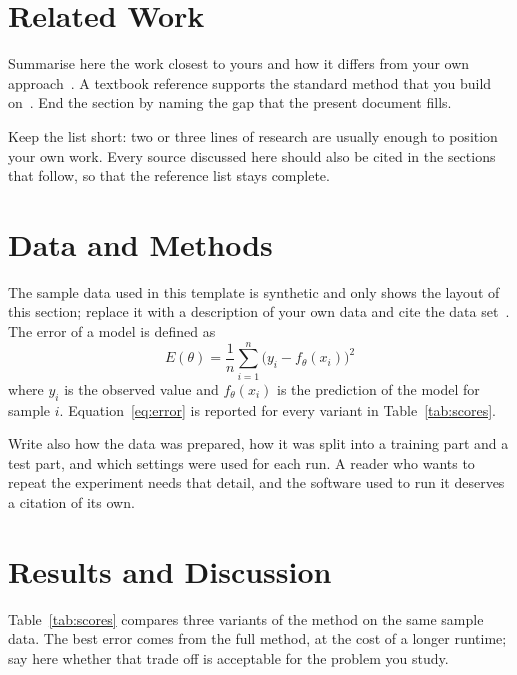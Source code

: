 \documentclass[10pt,journal]{IEEEtran}
\begin{document}
  \section{Related Work}
  Summarise here the work closest to yours and how it differs from your own
  approach~\cite{jones2023}. A textbook reference supports the standard method
  that you build on~\cite{williams2019}. End the section by naming the gap
  that the present document fills.

  Keep the list short: two or three lines of research are usually enough to
  position your own work. Every source discussed here should also be cited in
  the sections that follow, so that the reference list stays complete.

  \section{Data and Methods}
  The sample data used in this template is synthetic and only shows the layout
  of this section; replace it with a description of your own data and cite the
  data set~\cite{openlab2024}. The error of a model is defined as
  \begin{equation}
    E(\theta) = \frac{1}{n} \sum_{i=1}^{n} \bigl( y_i - f_\theta(x_i) \bigr)^2
    \label{eq:error}
  \end{equation}
  where $y_i$ is the observed value and $f_\theta(x_i)$ is the prediction of
  the model for sample $i$. Equation~\eqref{eq:error} is reported for every
  variant in Table~\ref{tab:scores}.

  Write also how the data was prepared, how it was split into a training part
  and a test part, and which settings were used for each run. A reader who
  wants to repeat the experiment needs that detail, and the software used to
  run it deserves a citation of its own.

  \section{Results and Discussion}
  Table~\ref{tab:scores} compares three variants of the method on the same
  sample data. The best error comes from the full method, at the cost of a
  longer runtime; say here whether that trade off is acceptable for the
  problem you study.
\end{document}
